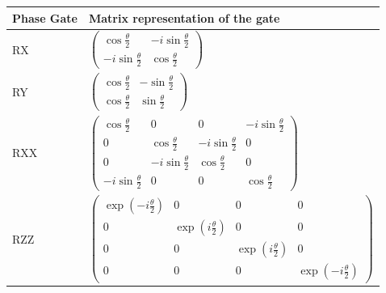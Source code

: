 \begin{table}[]
\label{tab:qgates}
        \begin{tabular}{l|l}
        \hline
        \multicolumn{1}{|l|}{Phase Gate}  & \multicolumn{1}{l|}{Matrix representation of the gate}                                                                                                                                                                                                                         \\ \hline
        RX                                & $\begin{pmatrix} \cos\frac{\theta}{2}&-i\sin\frac{\theta}{2}              \\ -i\sin\frac{\theta}{2}&\cos\frac{\theta}{2}                                                                                                                                        \end{pmatrix}$ \\
        RY                                & $\begin{pmatrix} \cos\frac{\theta}{2}&-\sin\frac{\theta}{2}               \\ \cos\frac{\theta}{2}&\sin\frac{\theta}{2}                                                                                                                                          \end{pmatrix}$ \\
        RXX                               & $\begin{pmatrix} \cos\frac{\theta}{2}&0&0&-i\sin\frac{\theta}{2}          \\ 0&\cos\frac{\theta}{2}&-i\sin\frac{\theta}{2}&0                           \\ 0&-i\sin\frac{\theta}{2}&\cos\frac{\theta}{2}&0 \\ -i\sin\frac{\theta}{2}&0&0&\cos\frac{\theta}{2}    \end{pmatrix}$ \\                               
        RZZ                               & $\begin{pmatrix} \exp(-i\frac{\theta}{2})&0&0&0                           \\ 0&\exp(i\frac{\theta}{2})&0&0                                             \\ 0&0&\exp(i\frac{\theta}{2})&0 \\ 0&0&0&\exp(-i\frac{\theta}{2})                                       \end{pmatrix}$ \\         

\end{tabular}
\end{table}
